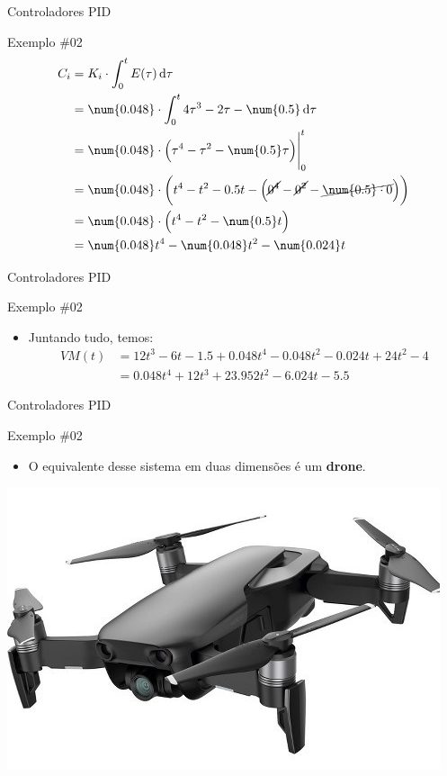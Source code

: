\begin{frame}{Controladores PID}
	\begin{block}{Exemplo \#02}
		\begin{align*}
		C_i	&=K_i\cdot \int_{0}^{t}E(\tau)\dif \tau\\
		&=\num{0.048}\cdot \int_{0}^{t}4\tau^{3}-2\tau-\num{0.5}\dif \tau\\
		&=\num{0.048}\cdot \eval{\del{\tau^{4}-\tau^{2}-\num{0.5}\tau}}_{0}^{t}\\
		&=\num{0.048}\cdot\del{t^{4}-t^{2}-0.5t-\del{\cancel{0^{4}}-\cancel{0^{2}}-\cancel{\num{0.5}\cdot0}}}\\
		&=\num{0.048}\cdot\del{t^{4}-t^{2}-\num{0.5}t}\\
		&=\num{0.048}t^{4}-\num{0.048}t^{2}-\num{0.024}t
		\end{align*}
	\end{block}
\end{frame}


\begin{frame}{Controladores PID}
	\begin{block}{Exemplo \#02}
		\begin{itemize}
			\item Juntando tudo, temos:
			\begin{align*}
			VM(t)&=12t^{3}-6t-\num{1.5}+\num{0.048}t^{4}-\num{0.048}t^{2}-\num{0.024}t+24t^{2}-4\\
			&=\num{0.048}t^{4}+12t^{3}+\num{23.952}t^{2}-\num{6.024}t-\num{5.5}
			\end{align*}
		\end{itemize}
	\end{block}
\end{frame}


\begin{frame}{Controladores PID}
	\begin{block}{Exemplo \#02}
		\begin{itemize}
			\item O equivalente desse sistema em duas dimensões é um \textbf{drone}.
		\end{itemize}
	\end{block}
	
	\medskip
	
	\centering
	
	\includegraphics[width=0.8\linewidth]{Figuras/Ch13/fig6}
\end{frame}


